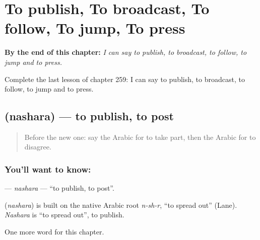 
\chapter{To publish, To broadcast, To follow, To jump, To press}
\label{ch:ar-to-publish-to-broadcast-to-follow-to-jump-to-press}

\begin{chapteropening}
\textbf{By the end of this chapter:} \emph{I can say to publish, to broadcast, to follow, to jump and to press.}

Complete the last lesson of chapter 259: I can say to publish, to broadcast, to follow, to jump and to press.
\end{chapteropening}

\section[\texorpdfstring{\ar{نشر} (nashara)}{نشر (nashara)}]{ (nashara) — to publish, to post}

\label{lesson:AR-C259-nashara}



\begin{quote}
Before the new one: say the Arabic for to take part, then the Arabic for to disagree.
\end{quote}

\subsection*{You'll want to know: }
\textbf{} — \emph{nashara} — \textquotedblleft{}to publish, to post\textquotedblright{}.

\begin{cousinweb}
\textbf{} (\emph{nashara}) is built on the native Arabic root \emph{n-sh-r}, \textquotedblleft{}to spread out\textquotedblright{} (Lane). \emph{Nashara} is \textquotedblleft{}to spread out\textquotedblright{}, to publish.
\end{cousinweb}

\begin{grammarlens}[title={What you've built}]
One more word for this chapter.
\end{grammarlens}

